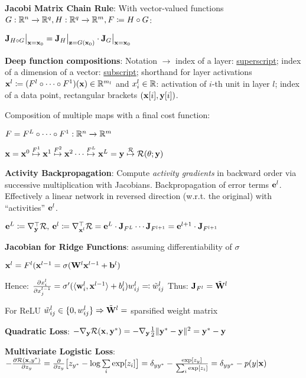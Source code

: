     \textbf{Jacobi Matrix Chain Rule}: With vector-valued functions $G:\mathbb R^n\xrightarrow{}\mathbb R^q,H:\mathbb R^q\xrightarrow{}\mathbb R^m,F\coloneqq H\circ G$:
    
    \tab$\mathbf J_{H \circ G}\bigr|_{\mathbf x=\mathbf x_0}=\mathbf J_{H}\bigr|_{\mathbf z=G(\mathbf x_0)}\cdot\mathbf J_{G}\bigr|_{\mathbf x=\mathbf x_0}$
    
    \textbf{Deep function compositions}: Notation $\xrightarrow{}$ index of a layer: \underline{superscript}; index of a dimension of a vector: \underline{subscript}; shorthand for layer activations $\mathbf x^l\coloneqq(F^l\circ\cdots\circ F^1)(\mathbf x)\in\mathbb R^{m_l}$ and $x_i^l\in\mathbb R$: activation of $i$-th unit in layer $l$; index of a data point, rectangular brackets $(\mathbf x\lbrack i \rbrack,\mathbf y\lbrack i \rbrack)$.
    
    Composition of multiple maps with a final cost function:
    
    \tab$F=F^L\circ\cdots\circ F^1:\mathbb R^n\xrightarrow{}\mathbb R^m$
    
    \tab$\mathbf x=\mathbf x^0\overset{F^1}{\mapsto}\mathbf x^1\overset{F^2}{\mapsto}\mathbf x^2\cdots\overset{F^L}{\mapsto}\mathbf x^L=\mathbf y\overset{\mathcal{R}}{\mapsto}\mathcal{R}(\theta;\mathbf y)$
    
    \textbf{Activity Backpropagation}: Compute \emph{activity gradients} in backward order via successive multiplication with Jacobians. Backpropagation of error terms $\mathbf e^l$. Effectively a linear network in reversed direction (w.r.t. the original) with ``activities'' $\mathbf e^l$.
    
    \tab$\mathbf e^L\coloneqq\nabla^{\mathop{\mathrm{\top}}}_\mathbf y\mathcal{R},\> \mathbf e^l\coloneqq\nabla^{\mathop{\mathrm{\top}}}_{\mathbf x^l}\mathcal{R}=\mathbf e^L\cdot\mathbf J_{F^L}\cdots\mathbf J_{F^{l+1}}=\mathbf e^{l+1}\cdot\mathbf J_{F^{l+1}}$
    
    \textbf{Jacobian for Ridge Functions}: assuming differentiability of $\sigma$
    
    \tab$\mathbf x^l=F^l(\mathbf x^{l-1}=\sigma(\mathbf W^l\mathbf x^{l-1}+\mathbf b^l)$
    
    Hence: $\frac{\partial x_i^l}{\partial x_j^{l-1}}=\sigma'(\langle\mathbf w^l_i,\mathbf x^{l-1}\rangle+b^l_i)w^l_{ij}\eqqcolon\Tilde{w}^l_{ij}$
    Thus: $\mathbf J_{F^l}=\Tilde{\mathbf W}^l$
    
    For ReLU $\Tilde{w}^l_{ij}\in\{0,w^l_{ij}\} \Rightarrow\Tilde{\mathbf W}^l =$ sparsified weight matrix
    
    \textbf{Quadratic Loss}: $-\nabla_\mathbf y\mathcal{R}(\mathbf x,\mathbf y^*)=-\nabla_\mathbf y\frac{1}{2}\lVert\mathbf y^*-\mathbf y\rVert^2=\mathbf y^*-\mathbf y$
    
    \textbf{Multivariate Logistic Loss}:$-\frac{\partial\mathcal{R}(\mathbf x,y^*)}{\partial z_y}=\frac{\partial}{\partial z_y}\bigr\lbrack z_{y^*}-\log\sum\limits_i\exp\lbrack z_i \rbrack \bigr\rbrack=\delta_{yy^*}-\frac{\exp\lbrack z_y\rbrack}{\sum_i\exp\lbrack z_i\rbrack}=\delta_{yy^*}-p(y|\mathbf x)$
    
